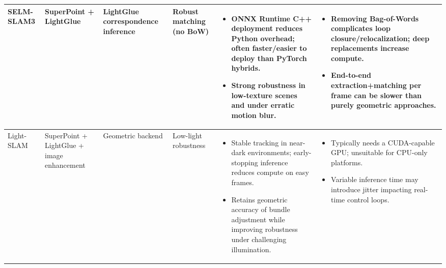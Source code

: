 \begin{table}[H]
{\begin{tabular}{|p{1.5cm}|p{1.5cm}|p{1.5cm}|p{1.5cm}|p{4.5cm}|p{4.5cm}|}
SELM-SLAM3 & SuperPoint + LightGlue & LightGlue correspondence inference & Robust matching (no BoW) &
\begin{itemize}[leftmargin=*, topsep=0pt, itemsep=0pt, parsep=0pt, partopsep=0pt]
  \item ONNX Runtime C++ deployment reduces Python overhead; often faster/easier to deploy than PyTorch hybrids.
  \item Strong robustness in low-texture scenes and under erratic motion blur.
\end{itemize} &
\begin{itemize}[leftmargin=*, topsep=0pt, itemsep=0pt, parsep=0pt, partopsep=0pt]
  \item Removing Bag-of-Words complicates loop closure/relocalization; deep replacements increase compute.
  \item End-to-end extraction+matching per frame can be slower than purely geometric approaches.
\end{itemize} \\
\hline

Light-SLAM & SuperPoint + LightGlue + image enhancement & Geometric backend & Low-light robustness &
\begin{itemize}[leftmargin=*, topsep=0pt, itemsep=0pt, parsep=0pt, partopsep=0pt]
  \item Stable tracking in near-dark environments; early-stopping inference reduces compute on easy frames.
  \item Retains geometric accuracy of bundle adjustment while improving robustness under challenging illumination.
\end{itemize} &
\begin{itemize}[leftmargin=*, topsep=0pt, itemsep=0pt, parsep=0pt, partopsep=0pt]
  \item Typically needs a CUDA-capable GPU; unsuitable for CPU-only platforms.
  \item Variable inference time may introduce jitter impacting real-time control loops.
\end{itemize} \\
\hline


\end{tabular}}
\end{table}
